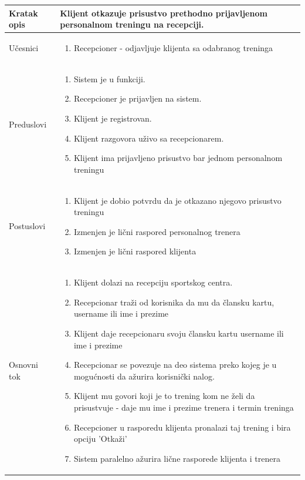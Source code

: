 \begin{longtable}{| p{} | p{} |} 
\hline
    Kratak opis & Klijent otkazuje prisustvo prethodno prijavljenom personalnom treningu na recepciji. \\ 
\hline    
    Učesnici &
    \begin{enumerate}
    \item Recepcioner - odjavljuje klijenta sa odabranog treninga
   \end{enumerate}\\
\hline
   Preduslovi & \begin{enumerate}
    \item Sistem je u funkciji.
    \item Recepcioner je prijavljen na sistem.
    \item Klijent je registrovan.
    \item Klijent razgovora uživo sa recepcionarem.
    \item Klijent ima prijavljeno prisustvo bar jednom personalnom treningu
   \end{enumerate} \\
\hline  
    Postuslovi &
    \begin{enumerate}
    \item Klijent je dobio potvrdu da je otkazano njegovo prisustvo treningu
    \item Izmenjen je lični raspored personalnog trenera
    \item Izmenjen je lični raspored klijenta
   \end{enumerate}\\
\hline
    Osnovni tok & 
    \begin{enumerate}
    \item Klijent dolazi na recepciju sportskog centra.
    \item Recepcionar traži od korisnika da mu da člansku kartu, username ili ime i prezime
    \item Klijent daje recepcionaru svoju člansku kartu username ili ime i prezime
    \item Recepcionar se povezuje na deo sistema preko kojeg je u mogućnosti da ažurira korisnički nalog.
    \item Klijent mu govori koji je to trening kom ne želi da prisustvuje - daje mu ime i prezime trenera i termin treninga
    \item Recepcioner u rasporedu klijenta pronalazi taj trening i bira opciju 'Otkaži' 
    \item Sistem paralelno ažurira lične rasporede klijenta i trenera

\end{enumerate}
\end{longtable}
